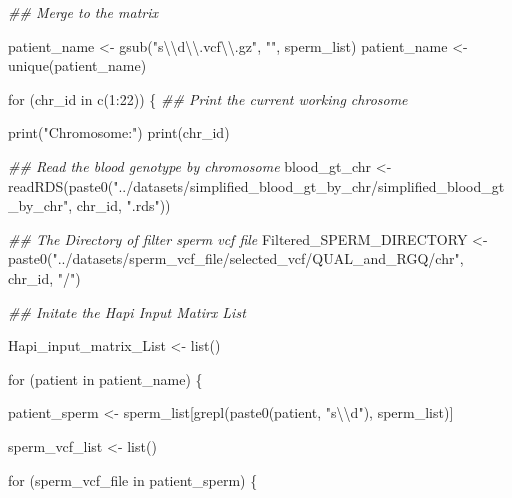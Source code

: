 \documentclass[
  letterpaper,
  DIV=11,
  numbers=noendperiod]{scrreprt}
\newenvironment{Shaded}{\begin{snugshade}}{\end{snugshade}}
\newcommand{\ControlFlowTok}[1]{\textcolor[rgb]{0.00,0.23,0.31}{#1}}
\newcommand{\DecValTok}[1]{\textcolor[rgb]{0.68,0.00,0.00}{#1}}
\newcommand{\DocumentationTok}[1]{\textcolor[rgb]{0.37,0.37,0.37}{\textit{#1}}}
\newcommand{\FunctionTok}[1]{\textcolor[rgb]{0.28,0.35,0.67}{#1}}
\newcommand{\NormalTok}[1]{\textcolor[rgb]{0.00,0.23,0.31}{#1}}
\newcommand{\OtherTok}[1]{\textcolor[rgb]{0.00,0.23,0.31}{#1}}
\newcommand{\SpecialCharTok}[1]{\textcolor[rgb]{0.37,0.37,0.37}{#1}}
\newcommand{\StringTok}[1]{\textcolor[rgb]{0.13,0.47,0.30}{#1}}
\begin{document}
\begin{codelisting}
\begin{Shaded}
\begin{Highlighting}[]
\DocumentationTok{\#\# Merge to the matrix}

\NormalTok{patient\_name }\OtherTok{\textless{}{-}} \FunctionTok{gsub}\NormalTok{(}\StringTok{"s}\SpecialCharTok{\textbackslash{}\textbackslash{}}\StringTok{d}\SpecialCharTok{\textbackslash{}\textbackslash{}}\StringTok{.vcf}\SpecialCharTok{\textbackslash{}\textbackslash{}}\StringTok{.gz"}\NormalTok{, }\StringTok{""}\NormalTok{, sperm\_list)}
\NormalTok{patient\_name }\OtherTok{\textless{}{-}} \FunctionTok{unique}\NormalTok{(patient\_name)}

\ControlFlowTok{for}\NormalTok{ (chr\_id }\ControlFlowTok{in} \FunctionTok{c}\NormalTok{(}\DecValTok{1}\SpecialCharTok{:}\DecValTok{22}\NormalTok{)) \{}
  \DocumentationTok{\#\# Print the current working chrosome}
  
  \FunctionTok{print}\NormalTok{(}\StringTok{"Chromosome:"}\NormalTok{)}
  \FunctionTok{print}\NormalTok{(chr\_id)}
  
  \DocumentationTok{\#\# Read the blood genotype by chromosome}
\NormalTok{  blood\_gt\_chr }\OtherTok{\textless{}{-}} \FunctionTok{readRDS}\NormalTok{(}\FunctionTok{paste0}\NormalTok{(}\StringTok{"../datasets/simplified\_blood\_gt\_by\_chr/simplified\_blood\_gt\_by\_chr"}\NormalTok{, chr\_id, }\StringTok{".rds"}\NormalTok{))}
  
  \DocumentationTok{\#\# The Directory of filter sperm vcf file}
\NormalTok{  Filtered\_SPERM\_DIRECTORY }\OtherTok{\textless{}{-}} \FunctionTok{paste0}\NormalTok{(}\StringTok{"../datasets/sperm\_vcf\_file/selected\_vcf/QUAL\_and\_RGQ/chr"}\NormalTok{, chr\_id, }\StringTok{"/"}\NormalTok{)}
  
  \DocumentationTok{\#\# Initate the Hapi Input Matirx List}
  
\NormalTok{  Hapi\_input\_matrix\_List }\OtherTok{\textless{}{-}} \FunctionTok{list}\NormalTok{()}
  
  \ControlFlowTok{for}\NormalTok{ (patient }\ControlFlowTok{in}\NormalTok{ patient\_name) \{}
    
\NormalTok{    patient\_sperm }\OtherTok{\textless{}{-}}\NormalTok{ sperm\_list[}\FunctionTok{grepl}\NormalTok{(}\FunctionTok{paste0}\NormalTok{(patient, }\StringTok{"s}\SpecialCharTok{\textbackslash{}\textbackslash{}}\StringTok{d"}\NormalTok{), sperm\_list)]}
    
\NormalTok{    sperm\_vcf\_list }\OtherTok{\textless{}{-}} \FunctionTok{list}\NormalTok{()}
    
    \ControlFlowTok{for}\NormalTok{ (sperm\_vcf\_file }\ControlFlowTok{in}\NormalTok{ patient\_sperm) \{}
      

\end{Highlighting}
\end{Shaded}
\end{codelisting}
\end{document}
